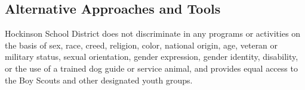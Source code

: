 \documentclass[12pt, letterpaper]{article}
\begin{document}
\subsection{Alternative Approaches and Tools}
\blindtext

\newpage


Hockinson School District does not discriminate in any programs
or activities on the basis of sex, race, creed, religion, color,
national origin, age, veteran or military status, sexual
orientation, gender expression, gender identity, disability, or the
use of a trained dog guide or service animal, and provides equal
access to the Boy Scouts and other designated youth groups.
\end{document}

